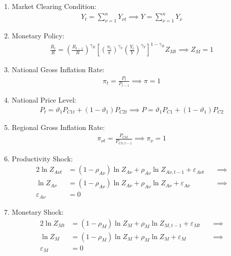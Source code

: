 \documentclass[
	thesis.tex
	]{subfiles}
\begin{document}
\begin{enumerate}
	\item Market Clearing Condition:
	\begin{align}
		Y_t = \sum_{\nu=1}^{n} Y_{\nu t} \implies Y = \sum_{\nu=1}^{n} Y_{\nu} \label{eq:reg-ss-market-clearing-condition}
	\end{align}
	
	\item Monetary Policy:
	\begin{align}
		\label{eq:reg-ss-monetary-policy}
		\frac{R_t}{R} =
		\left( \frac{R_{t-1}}{R} \right)^{\gamma_R}  \left[
		\left( \frac{\pi_t}{\pi} \right)^{\gamma_\pi}
		\left( \frac{Y_t}{Y} \right)^{\gamma_Y} \right]^{1-\gamma_R} Z_{Mt}
		\implies Z_{M} = 1
	\end{align}
	

	\item National Gross Inflation Rate:
	\begin{align}
		\pi_t = \frac{P_t}{P_{t-1}} \implies \pi = 1 \label{eq:reg-ss-gross-inflation-rate}
	\end{align}
	
	\item National Price Level:
	\begin{align}
		P_t = \vartheta_1 P_{C1 t} + (1 -\vartheta_1) P_{C2 t} \implies P = \vartheta_1 P_{C1} + (1 -\vartheta_1) P_{C2} \label{eq:ss-national-price-level}
	\end{align}
	
	\item Regional Gross Inflation Rate:
	\begin{align}
		\pi_{\nu t} = \frac{P_{C\nu t}}{P_{C\nu, t-1}} \implies \pi_{\nu} = 1 \label{eq:ss-regional-inflation}
	\end{align}

	
	\item Productivity Shock:
	\begin{alignat}{2}
		\ln{Z_{A\nu t}} &= (1 -\rho_{A\nu}) \ln{Z_{A\nu}} + \rho_{A\nu} \ln{Z_{A\nu,t-1}} + \varepsilon_{A\nu t} \quad &\implies \nonumber \\
		\ln{Z_{A\nu}} &= (1 -\rho_{A\nu}) \ln{Z_{A\nu}} + \rho_{A\nu} \ln{Z_{A\nu}} + \varepsilon_{A\nu} &\implies \nonumber \\
		\varepsilon_{A\nu} &= 0 \label{eq:reg-ss-productivity-shock}
	\end{alignat}
	
	\item Monetary Shock:
	\begin{alignat}{2}
		\ln{Z_{Mt}} &= (1-\rho_M)\ln{Z_{M}} + \rho_M\ln{Z_{M,t-1}} + \varepsilon_{Mt} \quad &\implies \nonumber \\
		\ln{Z_{M}} &= (1-\rho_M)\ln{Z_{M}} + \rho_M\ln{Z_{M}} + \varepsilon_{M} &\implies \nonumber \\
		\varepsilon_{M} &= 0 \label{eq:reg-ss-monetary-shock}
	\end{alignat}
	
\end{enumerate}
\end{document}
